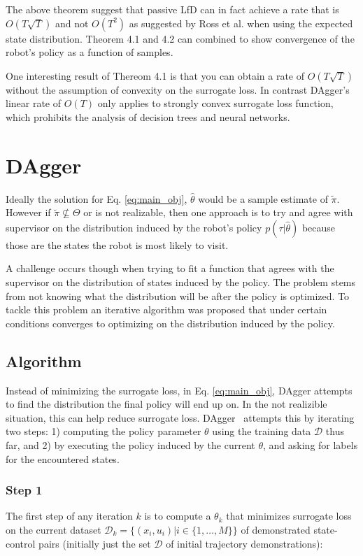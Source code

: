 \documentclass[10pt, conference]{ieeeconf}      %
\begin{document}
 The above theorem suggest that passive LfD can in fact achieve a rate that is $O(T\sqrt{T})$ and not $O(T^2)$ as suggested by Ross et al. \cite{ross2010reduction,ross2010efficient} when using the expected state distribution. Theorem 4.1 and 4.2 can combined to show convergence of the robot's policy as a function of samples. 
 
 

One interesting result of Thereom 4.1 is that you can obtain a rate of $O(T\sqrt{T})$ without the assumption of convexity on the surrogate loss. In contrast DAgger's linear rate of $O(T)$ only applies to strongly convex surrogate loss function, which prohibits the analysis of decision trees and neural networks. 

\section{DAgger}\label{sec:DAgger}
Ideally the solution for Eq. \ref{eq:main_obj}, $\hat{\theta}$ would be a sample estimate of $\tilde{\pi}$. However if $\tilde{\pi} \nsubseteq \Theta$ or is not realizable, then one approach is to try and agree with supervisor on the distribution induced by the robot's policy $p(\tau|\hat{\theta})$ because those are the states the robot is most likely to visit. 

A challenge occurs though when trying to fit a function that agrees with the supervisor on the distribution of states induced by the policy. The problem stems from not knowing what the distribution will be after the policy is optimized. To tackle this problem an iterative algorithm was proposed that under certain conditions converges to optimizing on the distribution induced by the policy. 


 \subsection{Algorithm}
Instead of  minimizing the surrogate loss, in Eq. \ref{eq:main_obj},  DAgger attempts to find the distribution the final policy will end up on. In the not realizible situation, this can help reduce surrogate loss. 
DAgger~\cite{ross2010reduction} attempts this by iterating two steps: 1)
computing the policy parameter $\theta$ using the training data $\mathcal{D}$ thus far, and 2) by executing the policy
induced by the current $\theta$, and asking for labels for the encountered states. 
 
\subsubsection{Step 1}
The first step of any iteration $k$ is to compute a $\theta_k$ that minimizes surrogate loss on the current dataset $\mathcal{D}_k=\{(x_i,u_i)|i\in\{1,\ldots,M\}\}$ of demonstrated state-control pairs (initially just the set $\mathcal{D}$ of initial trajectory demonstrations):
\end{document}
